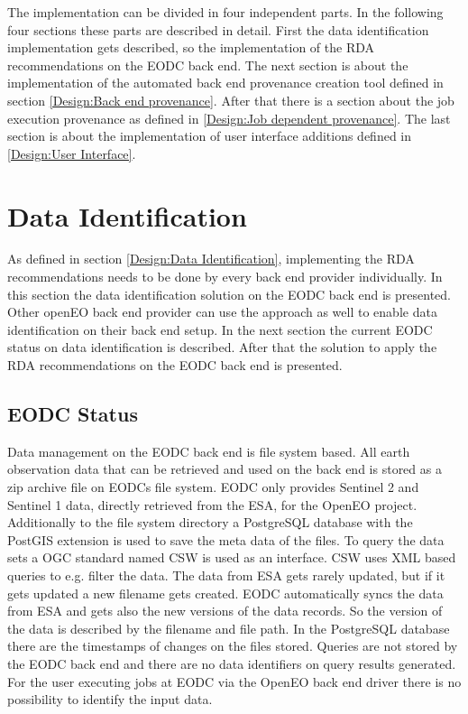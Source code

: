 \documentclass[draft,final]{vutinfth} %
\begin{document}
The implementation can be divided in four independent parts. In the following four sections these parts are described in detail. First the data identification implementation gets described, so the implementation of the RDA recommendations on the EODC back end. The next section is about the implementation of the automated back end provenance creation tool defined in section \ref{Design:Back end provenance}. After that there is a section about the job execution provenance as defined in \ref{Design:Job dependent provenance}. The last section is about the implementation of user interface additions defined in \ref{Design:User Interface}.     

\section{Data Identification}\label{Implementation:Data Identification}
As defined in section \ref{Design:Data Identification}, implementing the RDA recommendations needs to be done by every back end provider individually. In this section the data identification solution on the EODC back end is presented. Other openEO back end provider can use the approach as well to enable data identification on their back end setup. 
In the next section the current EODC status on data identification is described. After that the solution to apply the RDA recommendations on the EODC back end is presented. 
  
\subsection{EODC Status}
Data management on the EODC back end is file system based. All earth observation data that can be retrieved and used on the back end is stored as a zip archive file on EODCs file system. EODC only provides Sentinel 2 and Sentinel 1 data, directly retrieved from the ESA, for the OpenEO project. Additionally to the file system directory a PostgreSQL database with the PostGIS extension is used to save the meta data of the files. To query the data sets a OGC standard named CSW is used as an interface. CSW uses XML based queries to e.g. filter the data. The data from ESA gets rarely updated, but if it gets updated a new filename gets created. EODC automatically syncs the data from ESA and gets also the new versions of the data records. So the version of the data is described by the filename and file path. In the PostgreSQL database there are the timestamps of changes on the files stored. Queries are not stored by the EODC back end and there are no data identifiers on query results generated. For the user executing jobs at EODC via the OpenEO back end driver there is no possibility to identify the input data.            
\end{document}
